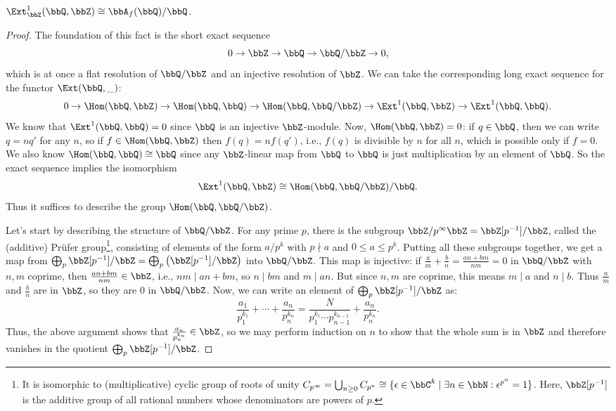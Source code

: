 \begin{thm}
    $\Ext_\bbZ^1(\bbQ,\bbZ)\cong \bbA_f(\bbQ)\slash\bbQ$.
\end{thm}
\begin{proof}
    The foundation of this fact is the short exact sequence
    \[0\to \bbZ\to \bbQ\to \bbQ\slash\bbZ\to 0,\]
    which is at once a flat resolution of $\bbQ\slash\bbZ$ and an injective resolution of $\bbZ$. We can take the corresponding long exact sequence for the functor $\Ext(\bbQ,\_)$:
    \[0\to \Hom(\bbQ,\bbZ)\to \Hom(\bbQ,\bbQ)\to \Hom(\bbQ,\bbQ\slash \bbZ)\to \Ext^1(\bbQ,\bbZ)\to \Ext^1(\bbQ,\bbQ).\]
    We know that $\Ext^1(\bbQ,\bbQ)=0$ since $\bbQ$ is an injective $\bbZ$-module. Now, $\Hom(\bbQ,\bbZ)=0$: if $q\in \bbQ$, then we can write $q=nq'$ for any $n$, so if $f\in\Hom(\bbQ,\bbZ)$ then $f(q)=nf(q')$, i.e., $f(q)$ is divisible by $n$ for all $n$, which is possible only if $f=0$. We also know $\Hom(\bbQ,\bbQ)\cong\bbQ$ since any $\bbZ$-linear map from $\bbQ$ to $\bbQ$ is just multiplication by an element of $\bbQ$. So the exact sequence implies the isomorphism
    \[\Ext^1(\bbQ,\bbZ)\cong \Hom(\bbQ,\bbQ\slash \bbZ)\slash \bbQ.\]
    Thus it suffices to describe the group $\Hom(\bbQ,\bbQ\slash \bbZ)$.

    Let's start by describing the structure of $\bbQ\slash\bbZ$. For any prime $p$, there is the subgroup $\bbZ\slash p^\infty\bbZ=\bbZ[p^{-1}]\slash\bbZ$, called the (additive) Pr\"ufer group\footnote{It is isomorphic to (multiplicative) cyclic group of roots of unity $C_{p^\infty}=\bigcup_{n\geq 0}C_{p^n}\cong\{\epsilon\in\bbC^k\mid \exists n\in\bbN: \epsilon^{p^n}=1\}$. Here, $\bbZ[p^{-1}]$ is the additive group of all rational numbers whose denominators are powers of $p$.}, consisting of elements of the form $a/p^k$ with $p\nmid a$ and $0\leq a\leq p^k$. Putting all these subgroups together, we get a map from $\bigoplus_p\bbZ[p^{-1}]\slash\bbZ=\bigoplus_p\left(\bbZ[p^{-1}]\slash\bbZ\right)$ into $\bbQ\slash\bbZ$. This map is injective: if $\frac am+\frac bn=\frac{an+bm}{nm}=0$ in $\bbQ\slash\bbZ$ with $n,m$ coprime, then $\frac{an+bm}{nm}\in\bbZ$, i.e., $nm\mid an+bm$, so $n\mid bm$ and $m\mid an$. But since $n,m$ are coprime, this means $m\mid a$ and $n\mid b$. Thus $\frac am$ and $\frac bn$ are in $\bbZ$, so they are $0$ in $\bbQ\slash\bbZ$. Now, we can write an element of $\bigoplus_p\bbZ[p^{-1}]\slash\bbZ$ as:
    \[\frac{a_1}{p_1^{k_1}}+\cdots +\frac{a_n}{p_n^{k_n}}=\frac{N}{p_1^{k_1}\cdots p_{n-1}^{k_{n-1}}}+\frac{a_n}{p_n^{k_n}}.\]
    Thus, the above argument shows that $\frac{a_n}{p_n^{k_n}}\in\bbZ$, so we may perform induction on $n$ to show that the whole sum is in $\bbZ$ and therefore vanishes in the quotient $\bigoplus_p\bbZ[p^{-1}]\slash\bbZ$.


\end{proof}
